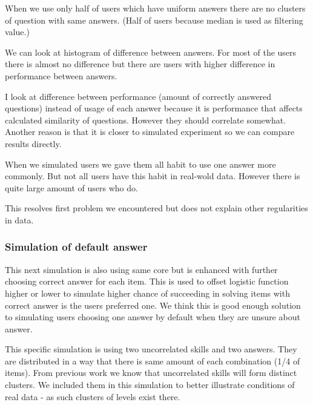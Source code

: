 \documentclass[
  digital, %
  table,   %
  nolof,     %
  nolot,     %
  nocover
]{fithesis3}
\begin{document}

When we use only half of users which have uniform answers there are no
clusters of question with same answers. (Half of users because median is
used as filtering value.)

We can look at histogram of difference between answers. For most of the
users there is almost no difference but there are users with higher
difference in performance between answers.


I look at difference between performance (amount of correctly answered
questions) instead of usage of each answer because it is performance
that affects calculated similarity of questions. However they should
correlate somewhat. Another reason is that it is closer to simulated
experiment so we can compare results directly.

When we simulated users we gave them all habit to use one answer more
commonly. But not all users have this habit in real-wold data. However
there is quite large amount of users who do.

This resolves first problem we encountered but does not explain other
regularities in data.

\subsubsection{Simulation of default answer}\label{simulation-of-default-answer}

This next simulation is also using same core but is enhanced with further choosing correct answer for each item. This is used to offset logistic function higher or lower to simulate higher chance of succeeding in solving items with correct answer is the users preferred one. We think this is good enough solution to simulating users choosing one answer by default when they are unsure about answer.

This specific simulation is using two uncorrelated skills and two answers. They are distributed in a way that there is same amount of each combination (1/4 of items). From previous work we know that uncorrelated skills will form distinct clusters. We included them in this simulation to better illustrate conditions of real data - as such clusters of levels exist there.
\end{document}
